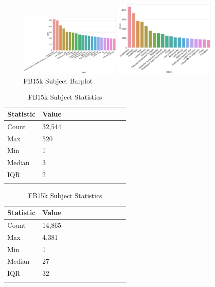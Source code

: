 
\begin{figure}[H]
	\parbox{.5\linewidth}{
   		\centering
    		\includegraphics[width=0.45\textwidth, height=0.2\textheight]{WN18_Subject_Counts}
		\caption{WN18 Subject Barplot}
		}
	\hfill
	\parbox{.5\linewidth}{
   		\centering
		\includegraphics[width=0.45\textwidth, height=0.2\textheight]{FB15k_Subject_Counts}
		\caption{FB15k Subject Barplot}
		}
\end{figure}

\begin{table}[H]
	\parbox{.5\linewidth}{
		\centering
		\begin{tabular}{lllllllllll}
  			\textbf{Statistic} & \textbf{Value}  \\
  			\hline
			Count & 32,544 \\
			Max & 520 \\
			Min & 1 \\
  			Median & 3 \\
  			IQR & 2 \\
			&
		\end{tabular}
		\caption{WN18 Subject Statistics}
		}
	\hfill
	\parbox{.5\linewidth}{
		\centering
		\begin{tabular}{lllllllllll}
  			\textbf{Statistic} & \textbf{Value}  \\
  			\hline
			Count &14,865 \\
			Max & 4,381 \\
			Min & 1 \\
  			Median & 27 \\
  			IQR & 32 \\
			&
		\end{tabular}
		\caption{FB15k Subject Statistics}
		}
\end{table}

